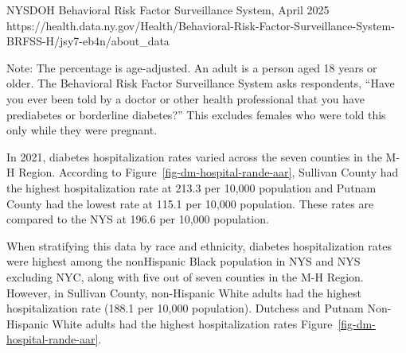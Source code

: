\documentclass[
  english,
  letterpaper,
]{report}
\begin{document}
\begin{tcolorbox}[enhanced jigsaw, breakable, leftrule=.75mm, title=\textcolor{quarto-callout-note-color}{\faInfo}\hspace{0.5em}{Source}, bottomrule=.15mm, opacityback=0, left=2mm, colback=white, bottomtitle=1mm, coltitle=black, colbacktitle=quarto-callout-note-color!10!white, colframe=quarto-callout-note-color-frame, opacitybacktitle=0.6, toptitle=1mm, titlerule=0mm, arc=.35mm, rightrule=.15mm, toprule=.15mm]

NYSDOH Behavioral Risk Factor Surveillance System, April 2025
https://health.data.ny.gov/Health/Behavioral-Risk-Factor-Surveillance-System-BRFSS-H/jsy7-eb4n/about\_data

\end{tcolorbox}

\begin{tcolorbox}[enhanced jigsaw, breakable, leftrule=.75mm, title=\textcolor{quarto-callout-note-color}{\faInfo}\hspace{0.5em}{Note}, bottomrule=.15mm, opacityback=0, left=2mm, colback=white, bottomtitle=1mm, coltitle=black, colbacktitle=quarto-callout-note-color!10!white, colframe=quarto-callout-note-color-frame, opacitybacktitle=0.6, toptitle=1mm, titlerule=0mm, arc=.35mm, rightrule=.15mm, toprule=.15mm]

Note: The percentage is age-adjusted. An adult is a person aged 18 years
or older. The Behavioral Risk Factor Surveillance System asks
respondents, ``Have you ever been told by a doctor or other health
professional that you have prediabetes or borderline diabetes?'' This
excludes females who were told this only while they were pregnant.

\end{tcolorbox}

In 2021, diabetes hospitalization rates varied across the seven counties
in the M-H Region. According to Figure~\ref{fig-dm-hospital-rande-aar},
Sullivan County had the highest hospitalization rate at 213.3 per 10,000
population and Putnam County had the lowest rate at 115.1 per 10,000
population. These rates are compared to the NYS at 196.6 per 10,000
population.

When stratifying this data by race and ethnicity, diabetes
hospitalization rates were highest among the nonHispanic Black
population in NYS and NYS excluding NYC, along with five out of seven
counties in the M-H Region. However, in Sullivan County, non-Hispanic
White adults had the highest hospitalization rate (188.1 per 10,000
population). Dutchess and Putnam Non-Hispanic White adults had the
highest hospitalization rates Figure~\ref{fig-dm-hospital-rande-aar}.
\end{document}
